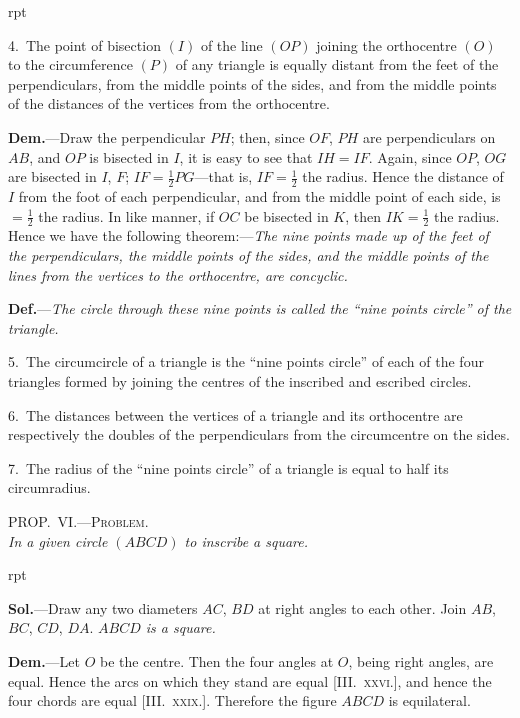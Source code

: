 \documentclass[oneside]{book}
\newcommand\myprop[2]{
\bigskip\Needspace*{4\baselineskip}\begin{center}\textsc{#1}\\\medskip\emph{#2}\par\end{center}
}
\newcommand\imgflow[3]{
\setcounter{wrapwidth}{#1}
\begin{wrapfigure}[#2]{r}{\value{wrapwidth}pt}
\begin{center}
\vspace{-0.3in}
\end{center}
\end{wrapfigure}
}
\begin{document}
\begin{footnotesize}
\imgflow{145}{16}{f159}

4.~The point of bisection $(I)$\label{bisection1} of the line $(OP)$ joining the orthocentre
$(O)$ to the circumference $(P)$
of any triangle is equally distant
from the feet of the perpendiculars,
from the middle points of
the sides, and from the middle
points of the distances of the vertices
from the orthocentre.

\textbf{Dem.}---Draw the perpendicular
$PH$; then, since $OF$, $PH$ are
perpendiculars on $AB$, and $OP$ is
bisected in $I$, it is easy to see that
$IH = IF$. Again, since $OP$, $OG$
are bisected in $I$, $F$; $IF = \frac{1}{2}PG$---that
is, $IF = \frac{1}{2}$ the radius. Hence
the distance of $I$ from the foot of each perpendicular, and from
the middle point of each side, is $= \frac{1}{2}$ the radius. In like manner,
if $OC$ be bisected in $K$, then $IK = \frac{1}{2}$ the radius. Hence we have
the following theorem:---\emph{The nine points made up of the feet of the
perpendiculars, the middle points of the sides, and the middle points
of the lines from the vertices to the orthocentre, are concyclic.}

\textbf{Def.}---\emph{The circle through these nine points is called the ``nine
points circle'' of the triangle.}

5.~The circumcircle of a triangle is the ``nine points circle''
of each of the four triangles formed by joining the centres of the
inscribed and escribed circles.

6.~The distances between the vertices of a triangle and its
orthocentre are respectively the doubles of the perpendiculars
from the circumcentre on the sides.

7.~The radius of the ``nine points circle'' of a triangle is equal
to half its circumradius.
\par\end{footnotesize}

\myprop{PROP\@.~VI\@.---Problem.}{In a given circle $(ABCD)$ to inscribe a square.}

\imgflow{120}{10}{f160}

\textbf{Sol.}---Draw any two diameters $AC$, $BD$ at right
angles to each other. Join $AB$,
$BC$, $CD$, $DA$. \emph{$ABCD$ is a square.}

\textbf{Dem.}---Let $O$ be the centre.
Then the four angles at $O$, being
right angles, are equal. Hence
the arcs on which they stand are
equal [\textsc{III\@.~xxvi.}], and hence the
four chords are equal [\textsc{III\@.~xxix.}].
Therefore the figure $ABCD$ is
equilateral.
\end{document}
